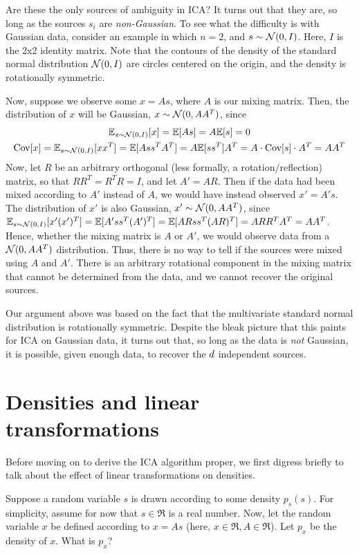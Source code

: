 \documentclass{article}
\begin{document}
Are these the only sources of ambiguity in ICA?  It turns out that they are, so long as
the sources $s_i$ are \emph{non-Gaussian}.  To see what the difficulty is with Gaussian data, consider
an example in which $n=2$, and $s \sim {\cal N}(0, I)$. Here,
$I$ is the 2x2 identity matrix.  Note that the contours of the density
of the standard normal distribution ${\cal N}(0,I)$ are circles centered on the
origin, and the density is rotationally symmetric.

Now, suppose we observe some $x=As$, where $A$ is our mixing matrix. Then, the distribution of $x$ will be Gaussian, $x \sim {\cal N}(0, AA^T)$, since
\begin{gather*}
\mathbb{E}_{s \sim {\cal N}(0,I)}[x] = \mathbb{E}[As] = A\mathbb{E}[s] = 0 \\
\text{Cov}[x] = \mathbb{E}_{s \sim {\cal N}(0,I)}[xx^T] = \mathbb{E}[Ass^TA^T] = A \mathbb{E}[ss^T] A^T = A \cdot \text{Cov}[s] \cdot A^T = AA^T
\end{gather*}
Now, let $R$ be an arbitrary orthogonal (less formally, a rotation/reflection) matrix, so that $RR^T = R^TR=I$, and let $A' = AR$. Then if the data had been mixed according to $A'$ instead of $A$, we would have instead observed $x'=A's$.  The distribution of $x'$ is also Gaussian, $x' \sim {\cal N}(0, AA^T)$, since $\mathbb{E}_{s \sim {\cal N}(0,I)}[x'(x')^T] = \mathbb{E}[A'ss^T(A')^T] = \mathbb{E}[ARss^T(AR)^T] = ARR^TA^T = AA^T$.  Hence, whether the mixing matrix is $A$ or $A'$, we would observe data from a ${\cal N}(0, AA^T)$ distribution.  Thus, there is no way to tell if the sources were mixed using $A$ and $A'$. There is an arbitrary rotational component in the mixing matrix that cannot be determined from the data, and we cannot recover the original sources.

Our argument above was based on the fact that the multivariate standard normal distribution
is rotationally symmetric.  Despite the bleak picture that this paints for ICA on Gaussian data,
it turns out that, so long as the data is \emph{not} Gaussian, it is possible, given enough
data, to recover the ${d}$ independent sources.


\section{Densities and linear transformations}

Before moving on to derive the ICA algorithm proper, we first digress briefly to
talk about the effect of linear transformations on densities.

Suppose a random variable $s$ is drawn according to some density $p_s(s)$.  For
simplicity, assume for now that $s \in \Re$ is a real number.
Now, let the random variable $x$ be defined according to $x = As$ (here, $x \in \Re, A \in \Re$).
Let $p_x$ be the density of $x$.  What is $p_x$?
\end{document}
